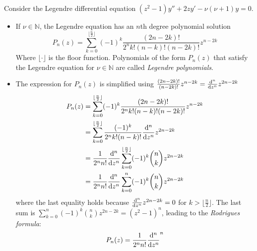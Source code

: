 \documentclass[11pt, a4paper]{article}
\begin{document}
Consider the Legendre differential equation $ (z^{2}-1)y'' + 2zy' - \nu (\nu +1)y = 0 $.
\begin{itemize}
	\item If $ \nu \in \mathbb{N} $, the Legendre equation has an $ n $th degree polynomial solution
	\begin{equation*}
		P_n(z) = \sum_{k=0}^{\lfloor \frac{n}{2}\rfloor}(-1)^{k}\frac{(2n-2k)!}{2^nk!(n-k)!(n-2k)!}z^{n-2k}
	\end{equation*}
	Where $ \lfloor \cdot \rfloor $ is the floor function. Polynomials of the form $ P_{n}(z) $ that satisfy the Legendre equation for $ \nu \in \mathbb{N} $ are called \textit{Legendre polynomials}.
	
	\item The expression for $ P_{n}(z) $ is simplified using $ \frac{(2n-2k)!}{(n-2k)!}z^{n-2k} = \dv[n]{}{z}z^{2n-2k} $
	\begin{align*}
		P_n(z) &= \sum_{k=0}^{\lfloor \frac{n}{2}\rfloor}(-1)^{k}\frac{(2n-2k)!}{2^nk!(n-k)!(n-2k)!}z^{n-2k}\\
		&=\sum_{k=0}^{\lfloor \frac{n}{2}\rfloor} \frac{(-1)^{k}}{2^nk!(n-k)!}\dv[n]{}{z}z^{2n-2k}\\
		&=\frac{1}{2^{n}n!}\dv[n]{}{z}\sum_{k=0}^{\lfloor \frac{n}{2}\rfloor} (-1)^{k} \binom{n}{k}z^{2n-2k}\\
		&=\frac{1}{2^{n}n!}\dv[n]{}{z}\sum_{k=0}^{n} (-1)^{k} \binom{n}{k}z^{2n-2k}
	\end{align*}
	where the last equality holds because $ \dv[n]{}{z} z^{2n-2k} = 0 $ for $ k > \lfloor \frac{n}{2}\rfloor $. The last sum is $\sum_{k=0}^{n} (-1)^{k} \binom{n}{k}z^{2n-2k} = (z^2 - 1)^n $, leading to the \textit{Rodrigues formula}:
	\begin{equation*}
		P_n(z) = \frac{1}{2^nn!}\dv[n]{}{z} (z^2 - 1)^n
	\end{equation*}
	

\end{itemize}
\end{document}
